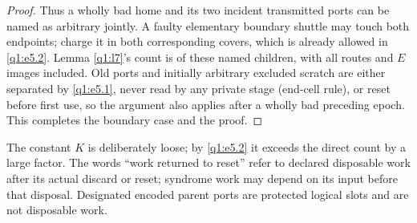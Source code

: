 \begin{proof}
Thus a wholly bad home and its two incident transmitted ports can be named as arbitrary jointly. A faulty elementary boundary shuttle may touch both endpoints; charge it in both corresponding covers, which is already allowed in \eqref{q1:e5.2}. Lemma \ref{q1:l7}'s count is of these named children, with all routes and \(E\) images included. Old ports and initially arbitrary excluded scratch are either separated by \eqref{q1:e5.1}, never read by any private stage (end-cell rule), or reset before first use, so the argument also applies after a wholly bad preceding epoch. This completes the boundary case and the proof.
\end{proof}


The constant \(K\) is deliberately loose; by \eqref{q1:e5.2} it exceeds the direct count by a large factor. The words ``work returned to reset'' refer to declared disposable work after its actual discard or reset; syndrome work may depend on its input before that disposal. Designated encoded parent ports are protected logical slots and are not disposable work.


